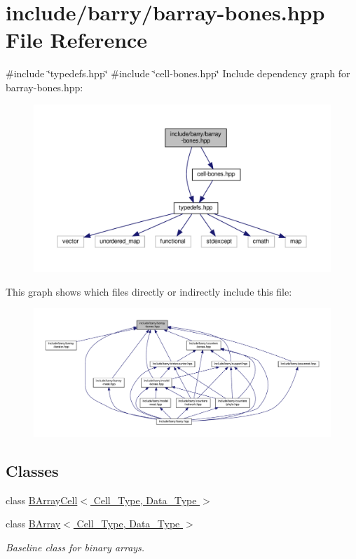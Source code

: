 \hypertarget{barray-bones_8hpp}{}\section{include/barry/barray-\/bones.hpp File Reference}
\label{barray-bones_8hpp}
{\ttfamily \#include \char`\"{}typedefs.\+hpp\char`\"{}}\newline
{\ttfamily \#include \char`\"{}cell-\/bones.\+hpp\char`\"{}}\newline
Include dependency graph for barray-\/bones.hpp\+:
\nopagebreak
\begin{figure}[H]
\begin{center}
\leavevmode
\includegraphics[width=350pt]{barray-bones_8hpp__incl}
\end{center}
\end{figure}
This graph shows which files directly or indirectly include this file\+:
\nopagebreak
\begin{figure}[H]
\begin{center}
\leavevmode
\includegraphics[width=350pt]{barray-bones_8hpp__dep__incl}
\end{center}
\end{figure}
\subsection*{Classes}
\begin{DoxyCompactItemize}
\item 
class \hyperlink{class_b_array_cell}{B\+Array\+Cell$<$ Cell\+\_\+\+Type, Data\+\_\+\+Type $>$}
\item 
class \hyperlink{class_b_array}{B\+Array$<$ Cell\+\_\+\+Type, Data\+\_\+\+Type $>$}
\begin{DoxyCompactList}\small\item\em Baseline class for binary arrays. \end{DoxyCompactList}\end{DoxyCompactItemize}
